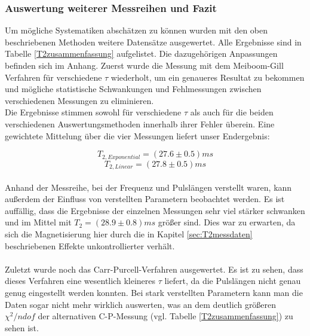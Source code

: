 \documentclass[12pt,a4paper]{article}
\begin{document}
\subsubsection{Auswertung weiterer Messreihen und Fazit}

Um mögliche Systematiken abschätzen zu können wurden mit den oben beschriebenen Methoden weitere Datensätze ausgewertet. Alle Ergebnisse sind in Tabelle \ref{T2zusammenfassung} aufgelistet. Die dazugehörigen Anpassungen befinden sich im Anhang.
Zuerst wurde die Messung mit dem Meiboom-Gill Verfahren für verschiedene $\tau$ wiederholt, um ein genaueres Resultat zu bekommen und mögliche statistische Schwankungen und Fehlmessungen zwischen verschiedenen Messungen zu eliminieren.\\
Die Ergebnisse stimmen sowohl für verschiedene $\tau$ als auch für die beiden verschiedenen Auswertungsmethoden innerhalb ihrer Fehler überein. 	Eine gewichtete Mittelung über die vier Messungen liefert unser Endergebnis:

\begin{equation*}
\boxed{T_{2, Exponential} = (27.6\pm 0.5)ms}
\end{equation*}
\begin{equation*}
\boxed{T_{2, Linear} = (27.8\pm 0.5)ms}
\end{equation*}\\

Anhand der Messreihe, bei der Frequenz und Pulslängen verstellt waren, kann außerdem der Einfluss von verstellten Parametern beobachtet werden. Es ist auffällig, dass die Ergebnisse der einzelnen Messungen sehr viel stärker schwanken und im Mittel mit $T_2 = (28.9\pm0.8)ms$ größer sind. Dies war zu erwarten, da sich die Magnetisierung hier durch die in Kapitel \ref{sec:T2messdaten} beschriebenen Effekte unkontrollierter verhält.\\
\\
Zuletzt wurde noch das Carr-Purcell-Verfahren ausgewertet. Es ist zu sehen, dass dieses Verfahren eine wesentlich kleineres $\tau$ liefert, da die Pulslängen nicht genau genug eingestellt werden konnten. Bei stark verstellten Parametern kann man die Daten sogar nicht mehr wirklich auswerten, was an dem deutlich größeren $\chi^2/ndof$ der alternativen C-P-Messung (vgl. Tabelle \ref{T2zusammenfassung}) zu sehen ist.
\end{document}

